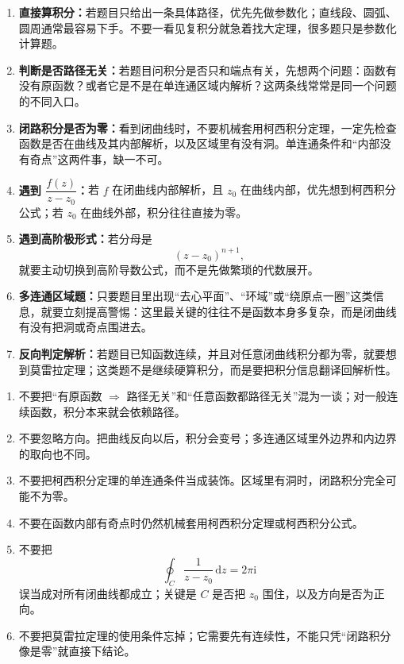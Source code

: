 \begin{tishi}[做题时的判断思路]
\begin{enumerate}
    \item \textbf{直接算积分：}若题目只给出一条具体路径，优先先做参数化；直线段、圆弧、圆周通常最容易下手。不要一看见复积分就急着找大定理，很多题只是参数化计算题。

    \item \textbf{判断是否路径无关：}若题目问积分是否只和端点有关，先想两个问题：函数有没有原函数？或者它是不是在单连通区域内解析？这两条线常常是同一个问题的不同入口。

    \item \textbf{闭路积分是否为零：}看到闭曲线时，不要机械套用柯西积分定理，一定先检查函数是否在曲线及其内部解析，以及区域里有没有洞。单连通条件和``内部没有奇点''这两件事，缺一不可。

    \item \textbf{遇到 $\dfrac{f(z)}{z-z_0}$：}若 $f$ 在闭曲线内部解析，且 $z_0$ 在曲线内部，优先想到柯西积分公式；若 $z_0$ 在曲线外部，积分往往直接为零。

    \item \textbf{遇到高阶极形式：}若分母是
    \[
        (z-z_0)^{n+1},
    \]
    就要主动切换到高阶导数公式，而不是先做繁琐的代数展开。

    \item \textbf{多连通区域题：}只要题目里出现``去心平面''、``环域''或``绕原点一圈''这类信息，就要立刻提高警惕：这里最关键的往往不是函数本身多复杂，而是闭曲线有没有把洞或奇点围进去。

    \item \textbf{反向判定解析：}若题目已知函数连续，并且对任意闭曲线积分都为零，就要想到莫雷拉定理；这类题不是继续硬算积分，而是要把积分信息翻译回解析性。
\end{enumerate}
\end{tishi}

\begin{jinshi}[本章最容易混淆的地方]
\begin{enumerate}
    \item 不要把``有原函数 $\Rightarrow$ 路径无关''和``任意函数都路径无关''混为一谈；对一般连续函数，积分本来就会依赖路径。
    \item 不要忽略方向。把曲线反向以后，积分会变号；多连通区域里外边界和内边界的取向也不同。
    \item 不要把柯西积分定理的单连通条件当成装饰。区域里有洞时，闭路积分完全可能不为零。
    \item 不要在函数内部有奇点时仍然机械套用柯西积分定理或柯西积分公式。
    \item 不要把
    \[
        \oint_C \frac{1}{z-z_0}\,\mathrm{d}z=2\pi\mathrm{i}
    \]
    误当成对所有闭曲线都成立；关键是 $C$ 是否把 $z_0$ 围住，以及方向是否为正向。
    \item 不要把莫雷拉定理的使用条件忘掉；它需要先有连续性，不能只凭``闭路积分像是零''就直接下结论。
\end{enumerate}
\end{jinshi}

